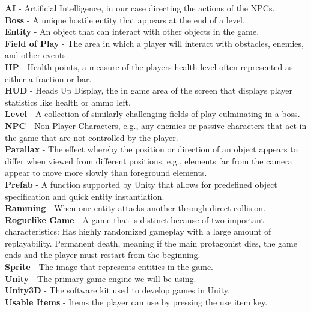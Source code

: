 \documentclass[12pt]{article}       %
\begin{document}
{\bf{AI}} - Artificial Intelligence, in our case directing the actions of the NPCs. \\
{\bf Boss} - A unique hostile entity that appears at the end of a level. \\
{\bf Entity} - An object that can interact with other objects in the game. \\
{\bf Field of Play} - The area in which a player will interact with obstacles, enemies, and other events. \\
{\bf HP} - Health points, a measure of the players health level often represented as either a fraction or bar. \\
{\bf HUD} - Heads Up Display, the in game area of the screen that displays player statistics like health or ammo left. \\
{\bf Level} - A collection of similarly challenging fields of play culminating in a boss. \\
{\bf NPC} - Non Player Characters, e.g., any enemies or passive characters that act in the game that are not controlled by the player. \\
{\bf Parallax} - The effect whereby the position or direction of an object appears to differ when viewed from different positions, e.g., elements far from the camera appear to move more slowly than foreground elements. \\
{\bf Prefab} - A function supported by Unity that allows for predefined object specification and quick entity instantiation. \\
{\bf Ramming} - When one entity attacks another through direct collision. \\
{\bf Roguelike Game} - A game that is distinct because of two important characteristics:
Has highly randomized gameplay with a large amount of replayability. 
Permanent death, meaning if the main protagonist dies, the game ends and the player must restart from the beginning. \\
{\bf Sprite} - The image that represents entities in the game. \\
{\bf Unity} - The primary game engine we will be using. \\
{\bf Unity3D} - The software kit used to develop games in Unity. \\
{\bf Usable Items} - Items the player can use by pressing the use item key. \\
\end{document}
